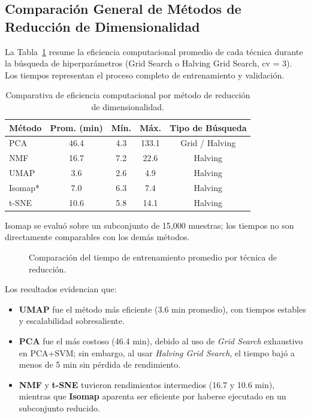 \documentclass[conference]{IEEEtran}
\begin{document}
\FloatBarrier


\subsection{Comparación General de Métodos de Reducción de Dimensionalidad}

La Tabla~\ref{tab:tiempos_dim} resume la eficiencia computacional promedio de cada técnica durante la búsqueda de hiperparámetros (Grid Search o Halving Grid Search, cv = 3).  
Los tiempos representan el proceso completo de entrenamiento y validación.

\begin{table}[H]
\centering
\caption{Comparativa de eficiencia computacional por método de reducción de dimensionalidad.}
\label{tab:tiempos_dim}
\begin{tabular}{lcccc}
\toprule
\textbf{Método} & \textbf{Prom. (min)} & \textbf{Mín.} & \textbf{Máx.} & \textbf{Tipo de Búsqueda} \\
\midrule
PCA & 46.4 & 4.3 & 133.1 & Grid / Halving \\
NMF & 16.7 & 7.2 & 22.6 & Halving \\
UMAP & 3.6 & 2.6 & 4.9 & Halving \\
Isomap* & 7.0 & 6.3 & 7.4 & Halving \\
t-SNE & 10.6 & 5.8 & 14.1 & Halving \\
\bottomrule
\end{tabular}

\raggedright
\footnotesize *Isomap se evaluó sobre un subconjunto de 15,000 muestras; los tiempos no son directamente comparables con los demás métodos.
\end{table}

\begin{figure}[H]
\centering

\caption{Comparación del tiempo de entrenamiento promedio por técnica de reducción.}
\label{fig:tiempos_modelos}
\end{figure}


Los resultados evidencian que:

\begin{itemize}
    \item \textbf{UMAP} fue el método más eficiente (3.6 min promedio), con tiempos estables y escalabilidad sobresaliente.
    \item \textbf{PCA} fue el más costoso (46.4 min), debido al uso de \textit{Grid Search} exhaustivo en PCA+SVM; sin embargo, al usar \textit{Halving Grid Search}, el tiempo bajó a menos de 5 min sin pérdida de rendimiento.
    \item \textbf{NMF} y \textbf{t-SNE} tuvieron rendimientos intermedios (16.7 y 10.6 min), mientras que \textbf{Isomap} aparenta ser eficiente por haberse ejecutado en un subconjunto reducido.
\end{itemize}
\end{document}
